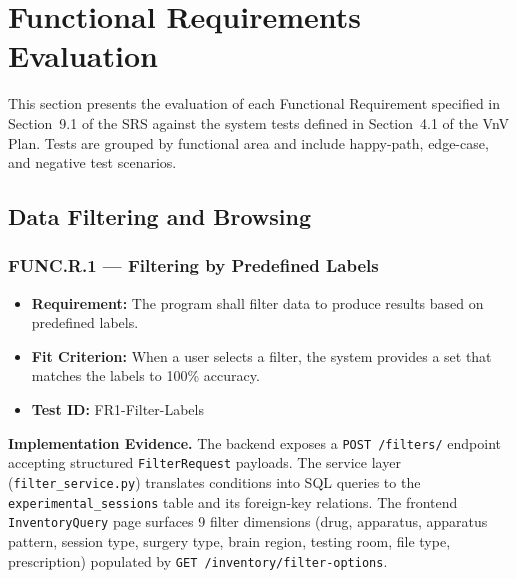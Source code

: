 \documentclass[12pt, titlepage]{article}
\begin{document}

\newpage

\tableofcontents

\listoftables %

\listoffigures %

\newpage


\section{Functional Requirements Evaluation}

This section presents the evaluation of each Functional Requirement specified in Section~9.1 of the SRS
against the system tests defined in Section~4.1 of the VnV Plan. Tests are grouped by functional area and
include happy-path, edge-case, and negative test scenarios. 

\subsection{Data Filtering and Browsing}

\subsubsection{FUNC.R.1 --- Filtering by Predefined Labels}

\begin{itemize}
  \item \textbf{Requirement:} The program shall filter data to produce results based on predefined labels.
  \item \textbf{Fit Criterion:} When a user selects a filter, the system provides a set that matches the labels to 100\% accuracy.
  \item \textbf{Test ID:} FR1-Filter-Labels
\end{itemize}

\begin{sloppypar}
\noindent\textbf{Implementation Evidence.}
The backend exposes a \texttt{POST /filters/} endpoint accepting structured \texttt{FilterRequest} payloads.
The service layer (\texttt{filter\_service.py}) translates conditions into SQL queries to the
\texttt{experimental\_sessions} table and its foreign-key relations. The frontend \texttt{InventoryQuery}
page surfaces 9 filter dimensions (drug, apparatus, apparatus pattern, session type, surgery type,
brain region, testing room, file type, prescription) populated by \texttt{GET /inventory/filter-options}.
\end{sloppypar}
\end{document}
